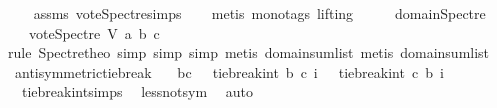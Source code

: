 \begin{isabellebody}
\isadelimproof
\ \ %
\endisadelimproof
%
\isatagproof
{}\isamarkupfalse%
\ assms\ vote{\isacharunderscore}{\kern0pt}Spectre{\isachardot}{\kern0pt}simps\isanewline
\ \ \isamarkupfalse%
\ {\isacharparenleft}{\kern0pt}metis\ {\isacharparenleft}{\kern0pt}mono{\isacharunderscore}{\kern0pt}tags{\isacharcomma}{\kern0pt}\ lifting{\isacharparenright}{\kern0pt}{\isacharparenright}{\kern0pt}%
\endisatagproof
{\isafoldproof}%
%
\isadelimproof
\ \isanewline
%
\endisadelimproof
\ \ \isanewline
\isanewline
{}\isamarkupfalse%
\ domain{\isacharunderscore}{\kern0pt}Spectre{\isacharcolon}{\kern0pt}\isanewline
\ \ \ {\isachardoublequoteopen}vote{\isacharunderscore}{\kern0pt}Spectre\ V\ a\ b\ c\ {\isasymin}\ {\isacharbraceleft}{\kern0pt}{\isacharminus}{\kern0pt}{}{\isacharcomma}{\kern0pt}\ {}{\isacharcomma}{\kern0pt}\ {}{\isacharbraceright}{\kern0pt}{\isachardoublequoteclose}\isanewline
%
\isadelimproof
%
\endisadelimproof
%
\isatagproof
{}\isamarkupfalse%
{\isacharparenleft}{\kern0pt}rule\ Spectre{\isacharunderscore}{\kern0pt}theo{\isacharcomma}{\kern0pt}\ simp{\isacharcomma}{\kern0pt}\ simp{\isacharcomma}{\kern0pt}\ simp{\isacharcomma}{\kern0pt}\ metis\ domain{\isacharunderscore}{\kern0pt}sumlist{\isacharcomma}{\kern0pt}\ metis\ domain{\isacharunderscore}{\kern0pt}sumlist{\isacharparenright}{\kern0pt}\ \isamarkupfalse%
%
\endisatagproof
{\isafoldproof}%
%
\isadelimproof
\isanewline
%
\endisadelimproof
\ \isanewline
\isanewline
{}\isamarkupfalse%
\ antisymmetric{\isacharunderscore}{\kern0pt}tie{\isacharunderscore}{\kern0pt}break{\isacharcolon}{\kern0pt}\isanewline
\ \ \ {\isachardoublequoteopen}b{\isasymnoteq}c\ \ {\isasymLongrightarrow}\ tie{\isacharunderscore}{\kern0pt}break{\isacharunderscore}{\kern0pt}int\ b\ c\ i\ {\isacharequal}{\kern0pt}\ {\isacharminus}{\kern0pt}\ tie{\isacharunderscore}{\kern0pt}break{\isacharunderscore}{\kern0pt}int\ c\ b\ {\isacharparenleft}{\kern0pt}{\isacharminus}{\kern0pt}i{\isacharparenright}{\kern0pt}{\isachardoublequoteclose}\isanewline
%
\isadelimproof
\ \ %
\endisadelimproof
%
\isatagproof
{}\isamarkupfalse%
\ \ tie{\isacharunderscore}{\kern0pt}break{\isacharunderscore}{\kern0pt}int{\isachardot}{\kern0pt}simps\ \isamarkupfalse%
\ less{\isacharunderscore}{\kern0pt}not{\isacharunderscore}{\kern0pt}sym\ \isamarkupfalse%
\ auto%
\endisatagproof
{\isafoldproof}%
%
\isadelimproof
\isanewline
%
\endisadelimproof
\isanewline
\ \ \ \isanewline

\end{isabellebody}

